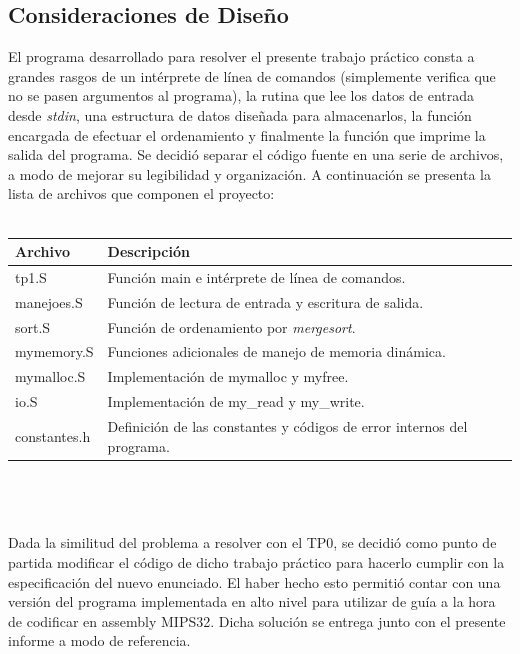 \documentclass[a4paper,10pt]{article}
\begin{document}
\subsection{Consideraciones de Dise\~no}
El programa desarrollado para resolver el presente trabajo pr\'actico consta a grandes rasgos de un int\'erprete de l\'inea de comandos (simplemente verifica que no se pasen argumentos al programa), la rutina que lee los datos de entrada desde \textit{stdin}, una estructura de datos dise\~nada para almacenarlos, la funci\'on encargada de efectuar el ordenamiento y finalmente la funci\'on que imprime la salida del programa. Se decidi\'o separar el c\'odigo fuente en una serie de archivos, a modo de mejorar su legibilidad y organizaci\'on. A continuaci\'on se presenta la lista de archivos que componen el proyecto:\\
\\
\begin{tabular}{|l|l|}
\hline
Archivo & Descripci\'on \\ \hline
tp1.S & Funci\'on main e int\'erprete de l\'inea de comandos. \\
manejoes.S & Funci\'on de lectura de entrada y escritura de salida. \\
sort.S & Funci\'on de ordenamiento por \textit{mergesort}. \\
mymemory.S & Funciones adicionales de manejo de memoria din\'amica. \\
mymalloc.S & Implementaci\'on de mymalloc y myfree. \\
io.S & Implementaci\'on de my\_read y my\_write. \\
constantes.h & Definici\'on de las constantes y c\'odigos de error internos del programa. \\
\hline
\end{tabular}\\
\\
\\Dada la similitud del problema a resolver con el TP0, se decidi\'o como punto de partida modificar el c\'odigo de dicho trabajo pr\'actico para hacerlo cumplir con la especificaci\'on del nuevo enunciado. El haber hecho esto permiti\'o contar con una versi\'on del programa implementada en alto nivel para utilizar de gu\'ia a la hora de codificar en assembly MIPS32. Dicha soluci\'on se entrega junto con el presente informe a modo de referencia.\\
\end{document}
